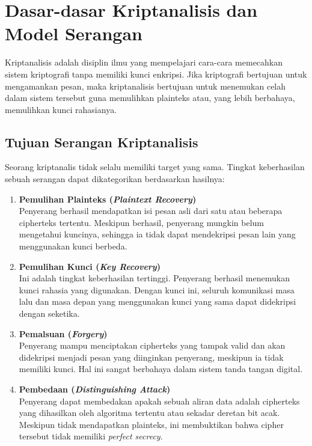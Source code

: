 \section{Dasar-dasar Kriptanalisis dan Model Serangan}

Kriptanalisis adalah disiplin ilmu yang mempelajari cara-cara memecahkan sistem kriptografi tanpa memiliki kunci enkripsi. Jika kriptografi bertujuan untuk mengamankan pesan, maka kriptanalisis bertujuan untuk menemukan celah dalam sistem tersebut guna memulihkan plainteks atau, yang lebih berbahaya, memulihkan kunci rahasianya.

\subsection{Tujuan Serangan Kriptanalisis}

Seorang kriptanalis tidak selalu memiliki target yang sama. Tingkat keberhasilan sebuah serangan dapat dikategorikan berdasarkan hasilnya:

\begin{enumerate}
    \item \textbf{Pemulihan Plainteks (\textit{Plaintext Recovery})} \\
    Penyerang berhasil mendapatkan isi pesan asli dari satu atau beberapa cipherteks tertentu. Meskipun berhasil, penyerang mungkin belum mengetahui kuncinya, sehingga ia tidak dapat mendekripsi pesan lain yang menggunakan kunci berbeda.

    \item \textbf{Pemulihan Kunci (\textit{Key Recovery})} \\
    Ini adalah tingkat keberhasilan tertinggi. Penyerang berhasil menemukan kunci rahasia yang digunakan. Dengan kunci ini, seluruh komunikasi masa lalu dan masa depan yang menggunakan kunci yang sama dapat didekripsi dengan seketika.

    \item \textbf{Pemalsuan (\textit{Forgery})} \\
    Penyerang mampu menciptakan cipherteks yang tampak valid dan akan didekripsi menjadi pesan yang diinginkan penyerang, meskipun ia tidak memiliki kunci. Hal ini sangat berbahaya dalam sistem tanda tangan digital.

    \item \textbf{Pembedaan (\textit{Distinguishing Attack})} \\
    Penyerang dapat membedakan apakah sebuah aliran data adalah cipherteks yang dihasilkan oleh algoritma tertentu atau sekadar deretan bit acak. Meskipun tidak mendapatkan plainteks, ini membuktikan bahwa cipher tersebut tidak memiliki \textit{perfect secrecy}.
\end{enumerate}


